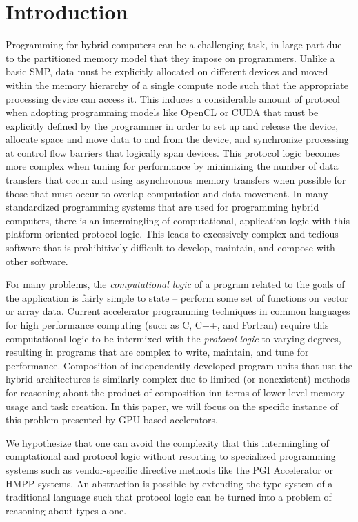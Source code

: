 
\section{Introduction}

Programming for hybrid computers can be a challenging task, in large
part due to the partitioned memory model that they impose on
programmers. Unlike a basic SMP, data must be explicitly allocated on
different devices and moved within the memory hierarchy of a single
compute node such that the appropriate processing device can access
it. This induces a considerable amount of protocol when adopting
programming models like OpenCL or CUDA that must be explicitly defined
by the programmer in order to set up and release the device, allocate
space and move data to and from the device, and synchronize processing
at control flow barriers that logically span devices. This protocol
logic becomes more complex when tuning for performance by minimizing
the number of data transfers that occur and using asynchronous memory
transfers when possible for those that must occur to overlap
computation and data movement.  In many standardized programming
systems that are used for programming hybrid computers, there is an
intermingling of computational, application logic with this
platform-oriented protocol logic.  This leads to excessively complex
and tedious software that is prohibitively difficult to develop,
maintain, and compose with other software.

For many problems, the \emph{computational logic} of a program related
to the goals of the application is fairly simple to state -- perform
some set of functions on vector or array data. Current accelerator
programming techniques in common languages for high performance
computing (such as C, C++, and Fortran) require this computational
logic to be intermixed with the \emph{protocol logic} to varying
degrees, resulting in programs that are complex to write, maintain,
and tune for performance.  Composition of independently developed
program units that use the hybrid architectures is similarly complex
due to limited (or nonexistent) methods for reasoning about the
product of composition inn terms of lower level memory usage and task
creation.  In this paper, we will focus on the specific instance of this
problem presented by GPU-based acclerators.

We hypothesize that one can avoid the complexity that this intermingling
of comptational and protocol logic without resorting to specialized
programming systems such as vendor-specific directive methods like the
PGI Accelerator or HMPP systems.  An abstraction is possible by
extending the type system of a traditional language such that protocol logic
can be turned into a problem of reasoning about types alone.  

